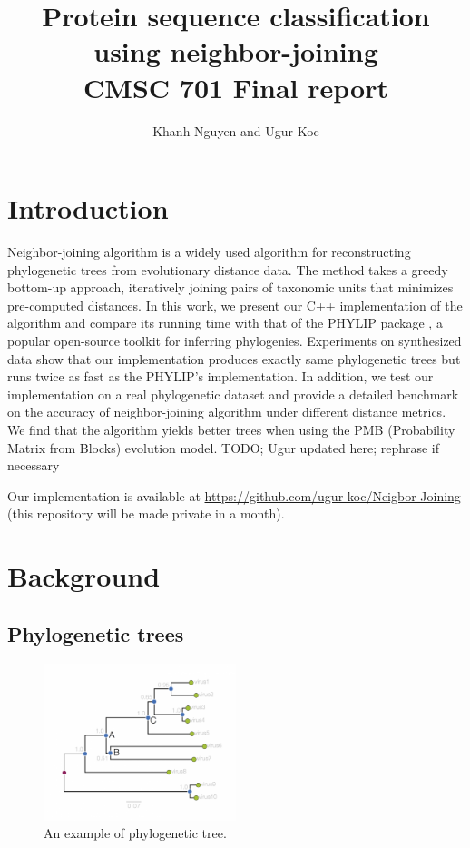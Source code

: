\documentclass[11pt,letterpaper]{article}
\title{
Protein sequence classification using neighbor-joining\\
   CMSC 701 Final report
}
\author{
	Khanh Nguyen and Ugur Koc
}
\theoremstyle{definition}
\begin{document}
\maketitle

\section{Introduction}

Neighbor-joining algorithm \cite{saitou1987neighbor} is a widely used algorithm for reconstructing phylogenetic trees from evolutionary distance data. The method takes a greedy bottom-up approach, iteratively joining pairs of taxonomic units that minimizes pre-computed distances. In this work, we present our C++ implementation of the algorithm and compare its running time with that of the PHYLIP package \cite{felsenstein2005phylip}, a popular open-source toolkit for inferring phylogenies. Experiments on synthesized data show that our implementation produces exactly same phylogenetic trees but runs twice as fast as the PHYLIP's implementation.  In addition, we test our implementation on a real phylogenetic dataset and provide a detailed benchmark on the accuracy of neighbor-joining algorithm under different distance metrics. We find that the algorithm yields better trees when using the PMB (Probability Matrix from Blocks) evolution model. TODO; Ugur updated here; rephrase if necessary

Our implementation is available at \url{https://github.com/ugur-koc/Neigbor-Joining} (this repository will be made private in a month).

\section{Background}


\subsection{Phylogenetic trees}

\begin{figure}[t]
  \centering
  \includegraphics[width=0.5\textwidth]{phylogram_1a.png}
  \caption{An example of phylogenetic tree.}
  \label{fig:phytree}
\end{figure}
\end{document}
